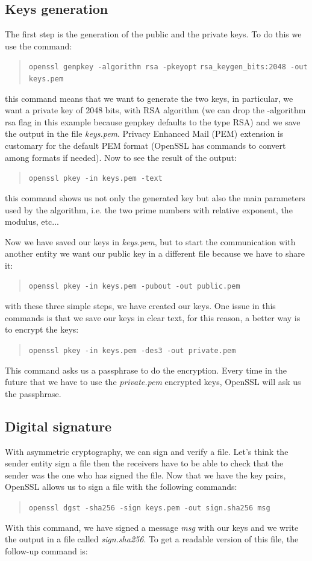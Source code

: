 \documentclass[11pt]{article}
\begin{document}
\subsection{Keys generation}
The first step is the generation of the public and the private keys. To do this we use the command:
\begin{quote}
 \verb|openssl genpkey -algorithm rsa -pkeyopt|\newline
 \verb|rsa_keygen_bits:2048 -out keys.pem|
\end{quote}
this command means that we want to generate the two keys, in particular, we want a private key of 2048 bits, with RSA algorithm (we can drop the -algorithm rsa flag in this example because genpkey defaults to the type RSA) and we save the output in the file {\em keys.pem}. Privacy Enhanced Mail (PEM) extension is customary for the default PEM format (OpenSSL has commands to convert among formats if needed). Now to see the result of the output:
\begin{quote}
 \verb|openssl pkey -in keys.pem -text|
\end{quote}
this command shows us not only the generated key but also the main parameters used by the algorithm, i.e. the two prime numbers with relative exponent, the modulus, etc...

Now we have saved our keys in {\em keys.pem}, but to start the communication with another entity we want our public key in a different file because we have to share it:
\begin{quote}
 \verb|openssl pkey -in keys.pem -pubout -out public.pem|
\end{quote}
with these three simple steps, we have created our keys. One issue in this commands is that we save our keys in clear text, for this reason, a better way is to encrypt the keys:
\begin{quote}
 \verb|openssl pkey -in keys.pem -des3 -out private.pem|
\end{quote}
This command asks us a passphrase to do the encryption. Every time in the future that we have to use the {\em private.pem} encrypted keys, OpenSSL will ask us the passphrase.

\subsection{Digital signature}
With asymmetric cryptography, we can sign and verify a file. Let's think the sender entity sign a file then the receivers have to be able to check that the sender was the one who has signed the file. Now that we have the key pairs, OpenSSL allows us to sign a file with the following commands:
\begin{quote}
 \verb|openssl dgst -sha256 -sign keys.pem -out sign.sha256 msg|
\end{quote}
With this command, we have signed a message {\em msg} with our keys and we write the output in a file called {\em sign.sha256}. To get a readable version of this file, the follow-up command is:
\end{document}
